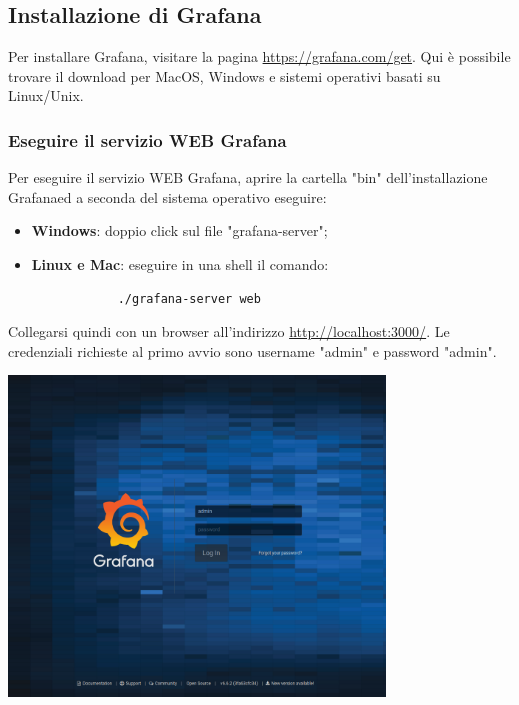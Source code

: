 \subsection{Installazione di Grafana}
Per installare Grafana\glo, visitare la pagina \url{https://grafana.com/get}. Qui è possibile trovare il download per MacOS, Windows e sistemi operativi basati su Linux/Unix.
\subsubsection{Eseguire il servizio WEB Grafana} Per eseguire il servizio WEB Grafana\glo, aprire la cartella "bin" dell'installazione Grafana\glosp ed a seconda del sistema operativo eseguire:
\begin{itemize}
	\item \textbf{Windows}: doppio click sul file "grafana-server";
	\item \textbf{Linux e Mac}: eseguire in una shell il comando:
		\begin{verbatim}
			./grafana-server web
		\end{verbatim}
\end{itemize}
Collegarsi quindi con un browser all'indirizzo \url{http://localhost:3000/}. Le credenziali richieste al primo avvio sono username "admin" e password "admin".
\begin{center}
\includegraphics[width=10cm,height=\textheight,keepaspectratio]{img/grafana-login.png}
\end{center}

